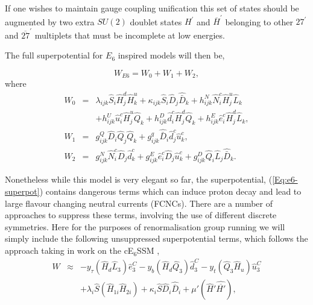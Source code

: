 \documentclass[preprint,amsmath,amssymb,aps,superscriptaddress,prd,showpacs,floatfix]{revtex4-1}
\newcommand{\be}{\begin{equation}}
\newcommand{\ee}{\end{equation}}
\newcommand{\ba}{\begin{eqnarray}}
\newcommand{\ea}{\end{eqnarray}}
\newcommand{\SuperField}[1]{\hat{#1}}
\begin{document}
If one wishes to maintain gauge coupling unification this set of
states should be augmented by two extra $SU(2)$ doublet states
$H^\prime$ and $\overline{H}^\prime$ belonging to other $27^\prime$
and $\overline{27}^\prime$ multiplets that must be incomplete at low
energies.

The full superpotential for $E_6$ inspired models will then be,

\be
W_{E6} = W_0 + W_1 + W_2,
\label{Eq:e6-superpot}
\ee where
\begin{eqnarray}
W_0 &=& \lambda_{ijk} \hat{S}_i \hat{H}^d_{j} \hat{H}^u_{k} + \kappa_{ijk} \hat{S}_i \hat{D}_j \hat{\bar{D}}_k + h^N_{ijk} \hat{N}^c_i \hat{H}^u_{j} \hat{L}_k \nonumber \\
& & + h^U_{ijk} \hat{u}^c_i \hat{H}^u_{j} \hat{Q}_k + h^D_{ijk} \hat{d}^c_i \hat{H}^d_{j} \hat{Q}_k + h^E_{ijk} \hat{e}^c_i \hat{H}^d_{j} \hat{L}_k, \\
W_1 &=& g^Q_{ijk} \hat{D}_i \hat{Q}_j \hat{Q}_k + g^q_{ijk} \hat{\bar{D}}_i \hat{d}^c_j \hat{u}^c_k, \\
W_2 &=& g^N_{ijk} \hat{N}^c_i \hat{D}_j \hat{d}^c_k + g^E_{ijk} \hat{e}^c_i \hat{D}_j \hat{u}^c_k + g^D_{ijk} \hat{Q}_i \hat{L}_j \hat{\bar{D}}_k.
\label{Eq:e6-superpot-parts}
\end{eqnarray}

Nonetheless while this model is very elegant so far, the  superpotential, (\ref{Eq:e6-superpot}) contains dangerous terms which can induce proton decay and lead to large flavour changing neutral currents (FCNCs).  There are a number of approaches to suppress these terms, involving the use of different discrete symmetries.  Here for the purposes of renormalisation group running we will simply include the following unsuppressed superpotential terms, which follows the approach taking in work on the cE$_6$SSM \cite{Athron:2009ue, Athron:2009bs},
%
    \ba
    W &\approx& - y_{\tau} (\SuperField{H}_d
    \SuperField{L}_3) \SuperField{e}^C_3 - y_b (\SuperField{H}_d
    \SuperField{Q}_3) \SuperField{d}_3^C - y_t (\SuperField{Q}_3
    \SuperField{H}_u) \SuperField{u}_3^C\\
    &&
    + \lambda_i \SuperField{S} (\SuperField{H}_{1i}
    \SuperField{H}_{2i}) + \kappa_i \SuperField{S} \SuperField{D}_i
    \SuperField{\overline{D}}_i + \mu' (\SuperField{H}'
    \SuperField{\overline{H'}}),
    \ea
  \label{SuPot_RGE}
%  
\end{document}
